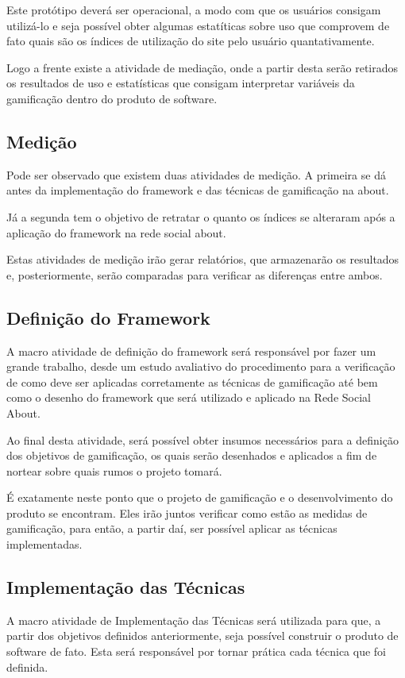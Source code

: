 Este protótipo deverá ser operacional, a modo com que os usuários consigam
utilizá-lo e seja possível obter algumas estatíticas sobre uso que comprovem
de fato quais são os índices de utilização do site pelo usuário quantativamente.

Logo a frente existe a atividade de mediação, onde a partir desta serão retirados
os resultados de uso e estatísticas que consigam interpretar variáveis da gamificação
dentro do produto de software. 

\subsection{Medição}
\label{sub:medicao}
Pode ser observado que existem duas atividades de medição. A primeira se dá
antes da implementação do framework  e das técnicas de gamificação na about.

Já a segunda tem o objetivo de retratar o quanto os índices se alteraram após
a aplicação do framework na rede social about.

Estas atividades de medição irão gerar relatórios, que armazenarão os resultados
e, posteriormente, serão comparadas para verificar as diferenças entre ambos.

\subsection{Definição do Framework}
\label{sub:definicaoframework}
A macro atividade de definição do framework será responsável por fazer um grande
trabalho, desde um estudo avaliativo do procedimento para a verificação de como
deve ser aplicadas corretamente as técnicas de gamificação até bem como o desenho
do framework que será utilizado e aplicado na Rede Social About.

Ao final desta atividade, será possível obter insumos necessários para a definição
dos objetivos de gamificação, os quais serão desenhados e aplicados a fim
de nortear sobre quais rumos o projeto tomará.

É exatamente neste ponto que o projeto de gamificação e o desenvolvimento do produto
se encontram. Eles irão juntos verificar como estão as medidas de gamificação, para
então, a partir daí, ser possível aplicar as técnicas implementadas.

\subsection{Implementação das Técnicas}
\label{sub:implematationtechnics}
A macro atividade de Implementação das Técnicas será utilizada para que, a partir
dos objetivos definidos anteriormente, seja possível construir o produto de software
de fato. Esta será responsável por tornar prática
cada técnica que foi definida.

